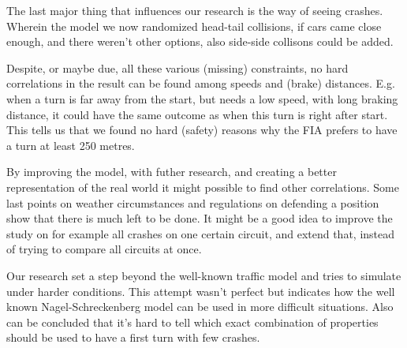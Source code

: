 The last major thing that influences our research is the way of seeing crashes. Wherein the model we now randomized head-tail collisions, if cars came close enough, and there weren't other options, also side-side collisons could be added.

Despite, or maybe due, all these various (missing) constraints, no hard correlations in the result can be found among speeds and (brake) distances. E.g. when a turn is far away from the start, but needs a low speed, with long braking distance, it could have the same outcome as when this turn is right after start. This tells us that we found no hard (safety) reasons why the FIA prefers to have a turn at least 250 metres.

By improving the model, with futher research, and creating a better representation of the real world it might possible to find other correlations. Some last points on weather circumstances and regulations on defending a position show that there is much left to be done. It might be a good idea to improve the study on for example all crashes on one certain circuit, and extend that, instead of trying to compare all circuits at once.

Our research set a step beyond the well-known traffic model and tries to simulate under harder conditions. This attempt wasn't perfect but indicates how the well known Nagel-Schreckenberg model can be used in more difficult situations. Also can be concluded that it's hard to tell which exact combination of properties should be used to have a first turn with few crashes.
